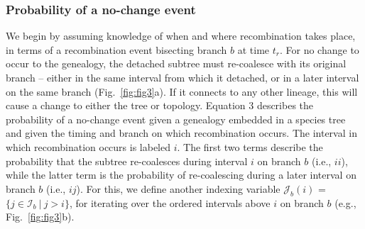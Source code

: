 \documentclass[11pt]{article}
\begin{document}
\subsubsection{Probability of a no-change event}
We begin by assuming knowledge of when and where recombination takes place, in terms 
of a recombination event bisecting branch $b$ at time $t_r$. %
For no change to occur to the genealogy, the detached subtree must re-coalesce with 
its original branch -- either in the same interval from which it detached, or in a
later interval on the same branch (Fig.~\ref{fig:fig3}a). %
If it connects to any other lineage, this will cause a change to either the tree 
or topology. 
Equation 3 describes the probability of a no-change event 
given a genealogy embedded in a species tree and given the timing and branch on 
which recombination occurs. The interval in which recombination occurs 
is labeled $i$. 
The first two terms describe the probability that the subtree re-coalesces 
during interval $i$ on branch $b$ (i.e., $ii$), 
while the latter term is the probability of re-coalescing
during a later interval on branch $b$ (i.e., $ij$). For this, we define 
another indexing variable $\mathcal{J}_b(i)$ = $\{j \in \mathcal{I}_b ~|~ j > i\}$, 
for iterating over the ordered intervals above $i$ on branch $b$ (e.g., Fig.~\ref{fig:fig3}b).
\end{document}
